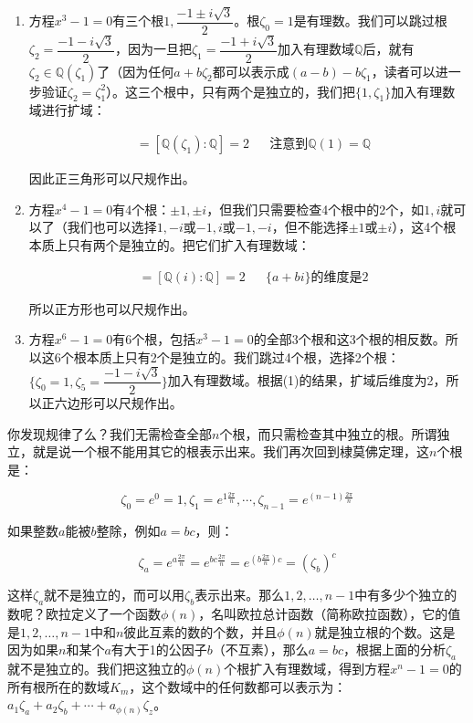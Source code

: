 \begin{enumerate}[(1)]
\item 方程$x^3 - 1 = 0$有三个根$1, \dfrac{-1 \pm i\sqrt{3}}{2}$。根$\zeta_0 = 1$是有理数。我们可以跳过根$\zeta_2 = \dfrac{-1 - i\sqrt{3}}{2}$，因为一旦把$\zeta_1 = \dfrac{-1 + i\sqrt{3}}{2}$加入有理数域$\mathbb{Q}$后，就有$\zeta_2 \in \mathbb{Q}(\zeta_1)$了（因为任何$a + b \zeta_2$都可以表示成$(a - b) - b \zeta_1$，读者可以进一步验证$\zeta_2 = \zeta_1^2$）。这三个根中，只有两个是独立的，我们把$\{1, \zeta_1\}$加入有理数域进行扩域：

\begin{align*}
[\mathbb{Q}(1, \zeta_1) : \mathbb{Q}] &= [\mathbb{Q}(\zeta_1) : \mathbb{Q}] = 2  && \text{注意到}\mathbb{Q}(1) = \mathbb{Q}
\end{align*}

因此正三角形可以尺规作出。

\item 方程$x^4 - 1 = 0$有4个根：$\pm 1, \pm i$，但我们只需要检查4个根中的2个，如$1, i$就可以了（我们也可以选择$1, -i$或$-1, i$或$-1, -i$，但不能选择$\pm 1$或$\pm i$），这4个根本质上只有两个是独立的。把它们扩入有理数域：

\begin{align*}
[\mathbb{Q}(1, i) : \mathbb{Q}] &= [\mathbb{Q}(i) : \mathbb{Q}] = 2 && \{a + bi\}\text{的维度是2}
\end{align*}

所以正方形也可以尺规作出。

\item 方程$x^6 - 1 = 0$有6个根，包括$x^3 - 1 = 0$的全部3个根和这3个根的相反数。所以这6个根本质上只有2个是独立的。我们跳过4个根，选择2个根：$\{\zeta_0 = 1, \zeta_5 = \dfrac{-1 - i\sqrt{3}}{2}\}$加入有理数域。根据(1)的结果，扩域后维度为2，所以正六边形可以尺规作出。
\end{enumerate}

你发现规律了么？我们无需检查全部$n$个根，而只需检查其中独立的根。所谓独立，就是说一个根不能用其它的根表示出来。我们再次回到棣莫佛定理，这$n$个根是：

\[
\zeta_0 = e^0 = 1, \zeta_1 = e^{1\frac{2\pi}{n}}, \dotsb, \zeta_{n-1} = e^{(n - 1)\frac{2\pi}{n}}
\]

如果整数$a$能被$b$整除，例如$a = bc$，则：

\[
\zeta_a = e^{a\frac{2\pi}{n}} = e^{bc\frac{2\pi}{n}} = e^{(b\frac{2\pi}{n})c} = (\zeta_b)^c
\]

这样$\zeta_a$就不是独立的，而可以用$\zeta_b$表示出来。那么$1, 2, \dotsc, n-1$中有多少个独立的数呢？欧拉定义了一个函数$\phi(n)$，名叫欧拉总计函数（简称欧拉函数），它的值是$1, 2, \dotsc, n-1$中和$n$彼此互素的数的个数，并且$\phi(n)$就是独立根的个数。这是因为如果$n$和某个$a$有大于1的公因子$b$（不互素），那么$a = bc$，根据上面的分析$\zeta_a$就不是独立的。我们把这独立的$\phi(n)$个根扩入有理数域，得到方程$x^n -1 = 0$的所有根所在的数域$K_m$，这个数域中的任何数都可以表示为：$a_1 \zeta_a + a_2\zeta_b + \dotsb + a_{\phi(n)}\zeta_z$。

